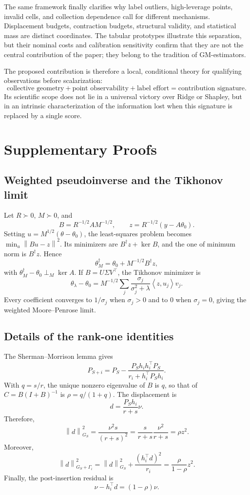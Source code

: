 \documentclass[10pt,a4paper]{article}
\newcommand{\Ker}{\operatorname{ker}}
\newcommand{\norm}[1]{\left\lVert #1\right\rVert}
\newcommand{\inner}[2]{\left\langle #1,#2\right\rangle}
\begin{document}
The same framework finally clarifies why label outliers, high-leverage points, invalid cells, and collection dependence call for different mechanisms. Displacement budgets, contraction budgets, structural validity, and statistical mass are distinct coordinates. The tabular prototypes illustrate this separation, but their nominal costs and calibration sensitivity confirm that they are not the central contribution of the paper; they belong to the tradition of GM-estimators.

The proposed contribution is therefore a local, conditional theory for qualifying observations before scalarization:
\[
\boxed{
\text{collective geometry}
+\text{point observability}
+\text{label effort}
=\text{contribution signature}.
}
\]
Its scientific scope does not lie in a universal victory over Ridge or Shapley, but in an intrinsic characterization of the information lost when this signature is replaced by a single score.

\appendix
\section{Supplementary Proofs}
\label{app:proofs}
\subsection{Weighted pseudoinverse and the Tikhonov limit}
\label{app:pseudoinverse}
Let $R\succ0$, $M\succ0$, and
\[
B=R^{-1/2}AM^{-1/2},
\qquad
z=R^{-1/2}(y-A\theta_0).
\]
Setting $u=M^{1/2}(\theta-\theta_0)$, the least-squares problem becomes $\min_u\norm{Bu-z}^2$. Its minimizers are $B^\dagger z+\Ker B$, and the one of minimum norm is $B^\dagger z$. Hence
\[
\theta_M^\dagger=\theta_0+M^{-1/2}B^\dagger z,
\]
with $\theta_M^\dagger-\theta_0\perp_M\Ker A$. If $B=U\Sigma V^\top$, the Tikhonov minimizer is
\[
\theta_\lambda-\theta_0
=M^{-1/2}\sum_j\frac{\sigma_j}{\sigma_j^2+\lambda}\inner{z}{u_j}v_j.
\]
Every coefficient converges to $1/\sigma_j$ when $\sigma_j>0$ and to $0$ when $\sigma_j=0$, giving the weighted Moore--Penrose limit.

\subsection{Details of the rank-one identities}
\label{app:rankone}
The Sherman--Morrison lemma gives
\[
P_{S+i}=P_S-
\frac{P_Sh_ih_i^\top P_S}{r_i+h_i^\top P_Sh_i}.
\]
With $q=s/r$, the unique nonzero eigenvalue of $B$ is $q$, so that of $C=B(I+B)^{-1}$ is $\rho=q/(1+q)$. The displacement is
\[
d=\frac{P_Sh_i}{r+s}\nu.
\]
Therefore,
\[
\norm d_{G_S}^2
=\frac{\nu^2s}{(r+s)^2}
=\frac{s}{r+s}\frac{\nu^2}{r+s}
=\rho z^2.
\]
Moreover,
\[
\norm d_{G_S+\Gamma_i}^2
=\norm d_{G_S}^2+\frac{(h_i^\top d)^2}{r_i}
=\frac{\rho}{1-\rho}z^2.
\]
Finally, the post-insertion residual is
\[
\nu-h_i^\top d=(1-\rho)\nu.
\]
\end{document}
